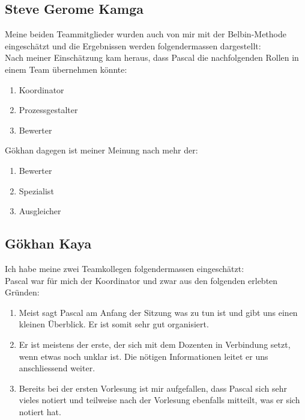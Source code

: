 \subsection*{Steve Gerome Kamga}

Meine beiden Teammitglieder wurden auch von mir mit der Belbin-Methode eingeschätzt und die Ergebnissen werden folgendermassen dargestellt: \\
Nach meiner Einschätzung kam heraus, dass Pascal die nachfolgenden Rollen in einem Team übernehmen könnte:
\begin{enumerate}
\item Koordinator
\item Prozessgestalter
\item Bewerter
\end{enumerate}


Gökhan dagegen ist meiner Meinung nach mehr der:
\begin{enumerate}
\item Bewerter
\item Spezialist
\item Ausgleicher
\end{enumerate}


\subsection*{Gökhan Kaya}

Ich habe meine zwei Teamkollegen folgendermassen eingeschätzt:\\

Pascal war für mich der Koordinator und zwar aus den folgenden erlebten Gründen:
\begin{enumerate} 
\item{Meist sagt Pascal am Anfang der Sitzung was zu tun ist und gibt uns einen kleinen Überblick. Er ist somit sehr gut organisiert.}
\item{Er ist meistens der erste, der sich mit dem Dozenten in Verbindung setzt, wenn etwas noch unklar ist. Die nötigen Informationen leitet er uns anschliessend weiter.}
\item{Bereits bei der ersten Vorlesung ist mir aufgefallen, dass Pascal sich sehr vieles notiert und teilweise nach der Vorlesung ebenfalls mitteilt, was er sich notiert hat.}
\end{enumerate}

